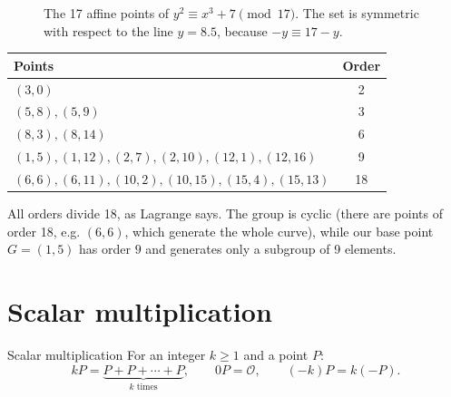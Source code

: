 \begin{figure}[H]
  \centering
  \caption{The 17 affine points of $y^2 \equiv x^3 + 7 \pmod{17}$. The set is symmetric with respect to the line $y = 8.5$, because $-y \equiv 17 - y$.}
  \label{fig:toycurve}
\end{figure}

\begin{center}
  \begin{tabular}{l c}
    \toprule
    Points & Order \\
    \midrule
    $(3,0)$ & 2 \\
    $(5,8), (5,9)$ & 3 \\
    $(8,3), (8,14)$ & 6 \\
    $(1,5), (1,12), (2,7), (2,10), (12,1), (12,16)$ & 9 \\
    $(6,6), (6,11), (10,2), (10,15), (15,4), (15,13)$ & 18 \\
    \bottomrule
  \end{tabular}
\end{center}

All orders divide 18, as Lagrange says. The group is cyclic (there are points of order 18, e.g. $(6,6)$, which generate the whole curve), while our base point $G = (1,5)$ has order $9$ and generates only a subgroup of 9 elements.


\section{Scalar multiplication}

\begin{frameddefn}[label={def:scalarmul}]{Scalar multiplication}
  For an integer $k \ge 1$ and a point $P$:
  \[
    kP = \underbrace{P + P + \cdots + P}_{k \text{ times}}, \qquad 0P = \mathcal{O}, \qquad (-k)P = k(-P).
  \]
\end{frameddefn}

